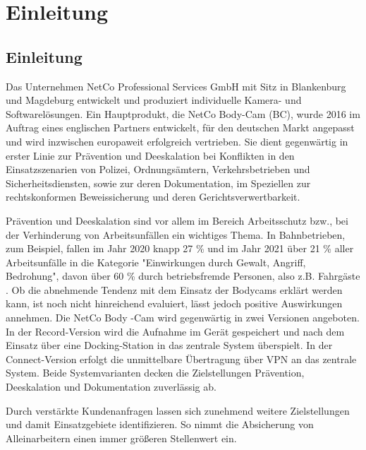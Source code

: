 \documentclass[thesis.tex]{subfiles}
\begin{document}
\chapter{Einleitung}
\label{chap:Einleitung}


\section{Einleitung}
Das Unternehmen NetCo Professional Services GmbH mit Sitz in Blankenburg und Magdeburg entwickelt und produziert individuelle Kamera- und Softwarelösungen.
Ein Hauptprodukt, die NetCo Body-Cam (BC), wurde 2016 im Auftrag eines englischen Partners entwickelt, für den deutschen Markt angepasst und wird inzwischen europaweit erfolgreich vertrieben.
Sie dient gegenwärtig in erster Linie zur Prävention und Deeskalation bei Konflikten in den Einsatzszenarien von Polizei, Ordnungsämtern, Verkehrsbetrieben und Sicherheitsdiensten, sowie zur deren Dokumentation, im Speziellen zur rechtskonformen Beweissicherung und deren Gerichtsverwertbarkeit.

Prävention und Deeskalation sind vor allem im Bereich Arbeitsschutz bzw., bei der Verhinderung von Arbeitsunfällen ein wichtiges Thema.
In Bahnbetrieben, zum Beispiel, fallen im Jahr 2020 knapp 27 \% und im Jahr 2021 über 21 \% aller Arbeitsunfälle in die Kategorie "Einwirkungen durch Gewalt, Angriff, Bedrohung", davon über 60 \% durch betriebsfremde Personen, also z.B. Fahrgäste \cite[jeweils S.87 ff.]{Unfallgeschehen2020,Unfallgeschehen2021}.
Ob die abnehmende Tendenz mit dem Einsatz der Bodycams erklärt werden kann, ist noch nicht hinreichend evaluiert, lässt jedoch positive Auswirkungen annehmen.
Die NetCo Body -Cam wird gegenwärtig in zwei Versionen angeboten.
In der Record-Version wird die Aufnahme im Gerät gespeichert und nach dem Einsatz über eine Docking-Station in das zentrale System überspielt.
In der Connect-Version erfolgt die unmittelbare Übertragung über VPN an das zentrale System.
Beide Systemvarianten decken die Zielstellungen Prävention, Deeskalation und Dokumentation zuverlässig ab.

Durch verstärkte Kundenanfragen lassen sich zunehmend weitere Zielstellungen und damit Einsatzgebiete identifizieren.
So nimmt die Absicherung von Alleinarbeitern einen immer größeren Stellenwert ein.
\end{document}
